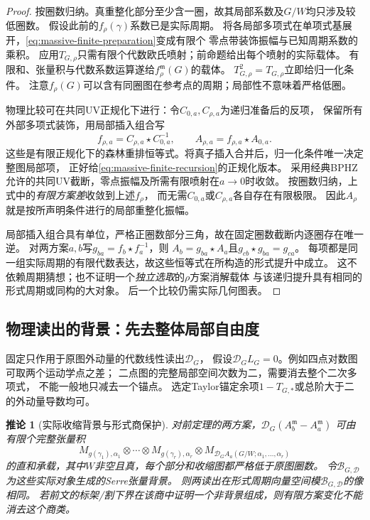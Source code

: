 \documentclass[11pt,a4paper]{ctexart}
\theoremstyle{cnplain}\newtheorem{theorem}{定理}[section]
\newtheorem{corollary}[theorem]{推论}
\theoremstyle{definition}\newtheorem{definition}[theorem]{定义}
\theoremstyle{remark}\newtheorem{remark}[theorem]{注}
\begin{document}
\begin{proof}
按圈数归纳。真重整化部分至少含一圈，故其局部系数及$G/W$均只涉及较低圈数。
假设此前的$f_\rho(\gamma)$系数已是实际周期。
将各局部多项式在单项式基展开，\eqref{eq:massive-finite-preparation}变成有限个
零点带装饰振幅与已知周期系数的乘积。
应用$T_{G,\rho}$只需有限个代数欧氏喷射；前命题给出每个喷射的实际载体。
有限和、张量积与代数系数运算遂给$f_\rho^{\mathfrak m}(G)$的载体。
$T_{G,\rho}^2=T_{G,\rho}$立即给归一化条件。
注意$f_\rho(G)$可以含有同圈图在参考点的周期；局部性不意味着严格低圈。

物理比较可在共同UV正规化下进行：令$C_{0,a},C_{\rho,a}$为递归准备后的反项，
保留所有外部多项式装饰，用局部插入组合写
\[
 f_{\rho,a}=C_{\rho,a}\star C_{0,a}^{-1},
 \qquad A_{\rho,a}=f_{\rho,a}\star A_{0,a}.
\]
这些是有限正规化下的森林重排恒等式。将真子插入合并后，归一化条件唯一决定整图局部项，
正好给\eqref{eq:massive-finite-recursion}的正规化版本。
采用经典BPHZ允许的共同UV截断，零点振幅及所需有限喷射在$a\to0$时收敛。
按圈数归纳，上式中的\emph{有限方案差}收敛到上述$f_\rho$，
而无需$C_{0,a}$或$C_{\rho,a}$各自存在有限极限。
因此$A_\rho$就是按所声明条件进行的局部重整化振幅。

局部插入组合具有单位，严格正圈数部分三角，故在固定圈数截断内逐圈存在唯一逆。
对两方案$a,b$写$g_{ba}=f_b\star f_a^{-1}$，则
$A_b=g_{ba}\star A_a$且$g_{cb}\star g_{ba}=g_{ca}$。
每项都是同一组实际周期的有限代数表达，故这些恒等式在所构造的形式提升中成立。
这不依赖周期猜想；也不证明一个\emph{独立选取}的$\rho$方案消解载体
与该递归提升具有相同的形式周期或同构的大对象。
后一个比较仍需实际几何图表。
\end{proof}

\subsection{物理读出的背景：先去整体局部自由度}

固定只作用于原图外动量的代数线性读出$\mathcal D_G$，
假设$\mathcal D_G L_G=0$。例如四点对数图可取两个运动学点之差；
二点图的完整局部空间次数为二，需要消去整个二次多项式，
不能一般地只减去一个锚点。
选定Taylor锚定余项$1-T_{G,*}$或总阶大于二的外动量导数均可。

\begin{corollary}[实际收缩背景与形式商保护]
\label{cor:massive-scheme-background}
对前定理的两方案，$\mathcal D_G(A_b^{\mathfrak m}-A_a^{\mathfrak m})$
可由有限个\emph{完整张量积}
\begin{equation}
 M_{g(\gamma_1),\alpha_1}\otimes\cdots\otimes
 M_{g(\gamma_r),\alpha_r}\otimes
 M_{\mathcal D_G A_a(G/W;\alpha_1,\ldots,\alpha_r)}
 \label{eq:massive-background-tensor}
\end{equation}
的直和承载，其中$W$非空且真，每个部分和收缩图都严格低于原图圈数。
令$\mathcal B_{G,\mathcal D}$为这些实际对象生成的Serre张量背景。
则两读出在形式周期向量空间模$\mathcal B_{G,\mathcal D}$的像相同。
若前文的标架/割下界在该商中证明一个非背景组成，则有限方案变化不能消去这个商类。
\end{corollary}
\end{document}
